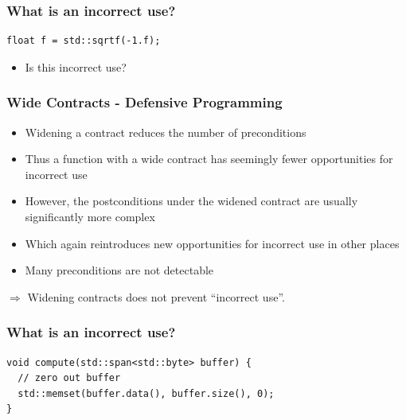 \documentclass[aspectratio=169]{beamer}
\newif\iftransitions
\newcommand{\cpause}{\iftransitions \pause \fi}
\begin{document}
\begin{frame}[fragile]
  \frametitle{What is an incorrect use?}
  
  \begin{lstlisting}[style=cpp20]
float f = std::sqrtf(-1.f);
  \end{lstlisting}
  
  \vspace{20pt}
  
  \begin{itemize}
    \item Is this incorrect use?
  \end{itemize}
  
\end{frame}

\begin{frame}
  \frametitle{Wide Contracts - Defensive Programming}
  
  \begin{itemize}
    \item Widening a contract reduces the number of preconditions \cpause
    \item Thus a function with a wide contract has seemingly fewer opportunities for incorrect use \cpause
    \item However, the postconditions under the widened contract are usually significantly more complex \cpause
    \item Which again reintroduces new opportunities for incorrect use in other places \cpause
    \item Many preconditions are not detectable \cpause
  \end{itemize}
  
  \vspace{20pt}
  
  $\Rightarrow$ Widening contracts does not prevent ``incorrect use''.
\end{frame}

\begin{frame}[fragile]
  \frametitle{What is an incorrect use?}
  
  \begin{lstlisting}[style=cpp20]
void compute(std::span<std::byte> buffer) {
  // zero out buffer
  std::memset(buffer.data(), buffer.size(), 0);
}
  \end{lstlisting}
  
\end{frame}
\end{document}
